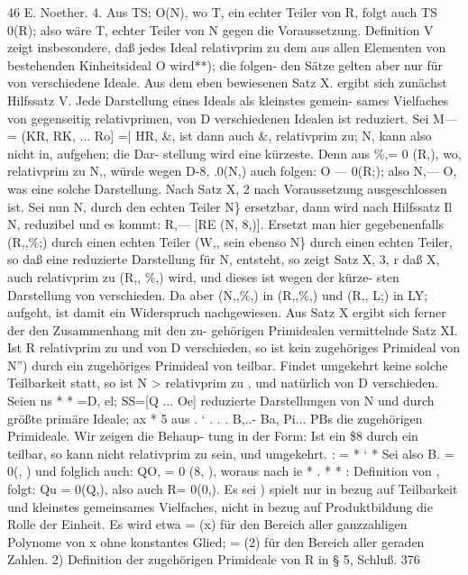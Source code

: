 \documentclass[11pt,a4paper]{article}
\theoremstyle{plain}
\theoremstyle{definition}
\begin{document}
46 
E. Noether. 
4. Aus TS; 
O(N), wo T, ein echter Teiler von R, folgt auch 
TS 
0(R); also wäre T, echter Teiler von N gegen die Voraussetzung. 
Definition V zeigt insbesondere, daß jedes Ideal relativprim zu dem 
aus allen Elementen von \guillemotright{} bestehenden Kinheitsideal O wird**); die folgen- 
den Sätze gelten aber nur für von  verschiedene 
Ideale. 
Aus dem eben bewiesenen Satz X. ergibt sich zunächst 
Hilfssatz V. Jede Darstellung eines Ideals als kleinstes gemein- 
sames 
Vielfaches 
von 
gegenseitig relativprimen, 
von D verschiedenen 
Idealen ist reduziert. 
Sei 
M---= 
(KR, RK, ... Ro] =| HR, \&, 
ist dann auch \&, relativprim zu; N, kann also nicht in, aufgehen; die Dar- 
stellung wird eine kürzeste. 
Denn aus \%,= 
0 (R,), wo, relativprim zu N,, 
würde wegen D-8, 
.0(N,) auch folgen: O --- 0(R;); 
also N,--- 
O, was 
eine solche Darstellung. Nach Satz X, 2 
nach Voraussetzung 
ausgeschlossen 
ist. 
Sei 
nun 
N, durch 
den echten 
Teiler N\} ersetzbar, 
dann 
wird 
nach 
Hilfssatz 
Il N, reduzibel 
und es 
kommt: R,--- 
[RE (N, 8,)]. 
Ersetzt man 
hier gegebenenfalls (R,,\%;) 
durch einen echten Teiler (W,, sein ebenso N\} durch einen echten 
Teiler, 
so daß eine reduzierte Darstellung 
für N, entsteht, 
so zeigt Satz X, 3, 
r 
daß X, auch relativprim zu (R,, \%,) wird, und dieses ist wegen der kürze- 
sten Darstellung von  verschieden. 
Da aber (N,,\%,) 
in (R,,\%,) und 
(R,, L;) in LY; aufgeht, ist damit ein Widerspruch nachgewiesen. 
Aus Satz X ergibt sich ferner der den Zusammenhang mit den zu- 
gehörigen Primidealen vermittelnde 
Satz XI. 
Ist R relativprim zu  und  von D verschieden, 
so 
ist kein zugehöriges Primideal von N'') durch ein zugehöriges Primideal 
von  teilbar. 
Findet umgekehrt keine solche Teilbarkeit statt, 
so ist N 
> 
relativprim zu , und natürlich  von D verschieden. 
Seien 
ns 
* 
* 
=D, 
el; 
SS=[Q 
... Oe] 
reduzierte 
Darstellungen 
von N und  durch 
größte primäre 
Ideale; 
ax 
* 
5 
aus 
. 
` 
. 
. 
. 
B,..- Ba, Pi... PBs die zugehörigen Primideale. 
Wir zeigen die Behaup- 
tung in der Form: 
Ist ein \$8 durch 
ein  
teilbar, 
so kann 
nicht 
relativprim zu  sein, und umgekehrt. 
: 
= 
* 
` 
* 
Sei also B. = 0(, ) und folglich auch: QO, = 0 (8, ), woraus nach 
ie 
* 
. 
* 
* 
: 
Definition von , folgt: Qu = 0(Q,), also auch R= 
0(0,). 
Es sei 
)  spielt nur in bezug auf Teilbarkeit und kleinstes gemeinsames Vielfaches, 
nicht in bezug auf Produktbildung die Rolle der Einheit. 
Es wird etwa 
 = (x) für 
den Bereich aller ganzzahligen Polynome von x ohne konstantes Glied;  = (2) für den 
Bereich aller geraden Zahlen. 
2\textdegree{}) Definition der zugehörigen Primideale von R in \S{} 5, Schluß. 
376
\end{document}
